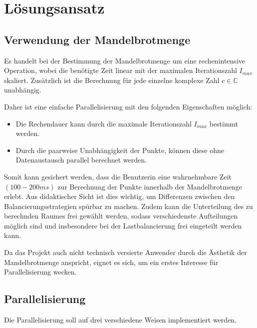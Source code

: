 \section{Lösungsansatz}

\subsection{Verwendung der Mandelbrotmenge}

Es handelt bei der Bestimmung der Mandelbrotmenge um eine rechenintensive Operation, wobei
die benötigte Zeit linear mit der maximalen Iterationszahl \( I_{max} \) skaliert.
Zusätzlich ist die Berechnung für jede einzelne komplexe Zahl \( c\in \mathbb{C} \)	unabhängig.

Daher ist eine einfache Parallelisierung mit den folgenden Eigenschaften möglich:
\begin{itemize}
	\item Die Rechendauer kann durch die maximale Iterationszahl \( I_{max} \) bestimmt werden.
	\item Durch die paarweise Unabhängigkeit der Punkte, können diese ohne Datenaustausch parallel berechnet werden.
\end{itemize}

Somit kann gesichert werden, dass die Benutzerin eine wahrnehmbare Zeit \( (100 - 200 ms) \) zur Berechnung der Punkte innerhalb
der Mandelbrotmenge erlebt.
Aus didaktischer Sicht ist dies wichtig, um Differenzen zwischen den Balancierungsstrategien spürbar zu machen.
Zudem kann die Unterteilung des zu berechnden Raumes frei gewählt werden, sodass
verschiedenste Aufteilungen möglich sind und insbesondere bei der Lastbalancierung frei eingeteilt werden kann.

Da das Projekt auch nicht technisch versierte Anwender durch die Ästhetik der Mandelbrotmenge anspricht, eignet es
sich, um ein erstes Interesse für Parallelisierung wecken.


\subsection{Parallelisierung}

Die Parallelisierung soll auf drei verschiedene Weisen implementiert werden.

